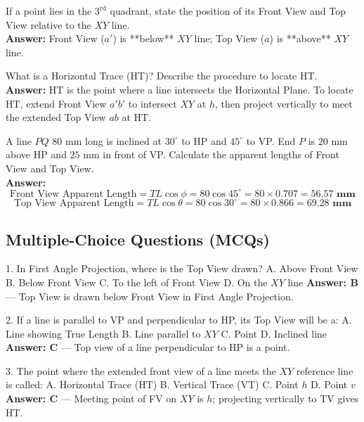 \begin{vivaqa}
If a point lies in the $3^{\text{rd}}$ quadrant, state the position of its Front View and Top View relative to the $XY$ line.\\[4pt]
\textbf{Answer:} Front View ($a'$) is **below** $XY$ line; Top View ($a$) is **above** $XY$ line.
\end{vivaqa}

\begin{vivaqa}
What is a Horizontal Trace ($\text{HT}$)? Describe the procedure to locate $\text{HT}$.\\[4pt]
\textbf{Answer:} $\text{HT}$ is the point where a line intersects the Horizontal Plane. To locate $\text{HT}$, extend Front View $a'b'$ to intersect $XY$ at $h$, then project vertically to meet the extended Top View $ab$ at $\text{HT}$.
\end{vivaqa}

\begin{vivaqa}
A line $PQ$ $80\text{ mm}$ long is inclined at $30^\circ$ to HP and $45^\circ$ to VP. End $P$ is $20\text{ mm}$ above HP and $25\text{ mm}$ in front of VP. Calculate the apparent lengths of Front View and Top View.\\[4pt]
\textbf{Answer:}  
$$\text{Front View Apparent Length} = TL \cos \phi = 80 \cos 45^\circ = 80 \times 0.707 = \mathbf{56.57\text{ mm}}$$
$$\text{Top View Apparent Length} = TL \cos \theta = 80 \cos 30^\circ = 80 \times 0.866 = \mathbf{69.28\text{ mm}}$$
\end{vivaqa}

\subsection{Multiple-Choice Questions (MCQs)}

1. In First Angle Projection, where is the Top View drawn?  
   A. Above Front View  
   B. Below Front View  
   C. To the left of Front View  
   D. On the $XY$ line  
   \textbf{Answer: B} — Top View is drawn below Front View in First Angle Projection.

2. If a line is parallel to VP and perpendicular to HP, its Top View will be a:  
   A. Line showing True Length  
   B. Line parallel to $XY$  
   C. Point  
   D. Inclined line  
   \textbf{Answer: C} — Top view of a line perpendicular to HP is a point.

3. The point where the extended front view of a line meets the $XY$ reference line is called:  
   A. Horizontal Trace ($\text{HT}$)  
   B. Vertical Trace ($\text{VT}$)  
   C. Point $h$  
   D. Point $v$  
   \textbf{Answer: C} — Meeting point of FV on $XY$ is $h$; projecting vertically to TV gives $\text{HT}$.

